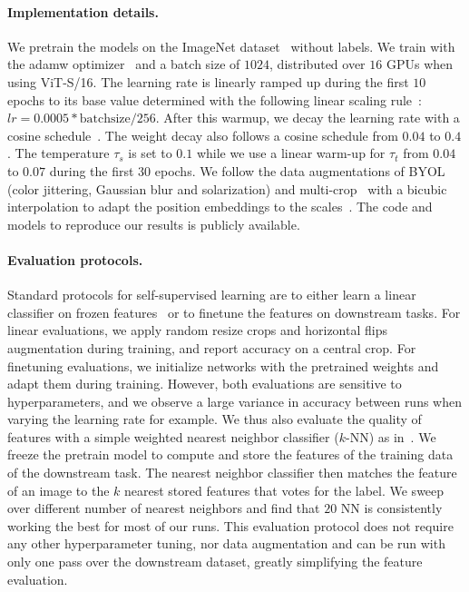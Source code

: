 \paragraph{Implementation details.}
We pretrain the models on the ImageNet dataset~\cite{russakovsky2015imagenet} without labels.
We train with the adamw optimizer~\cite{loshchilov2018fixing} and a batch size of $1024$, distributed over $16$ GPUs when using ViT-S/16.
The learning rate is linearly ramped up during the first $10$ epochs to its base value determined with the following linear scaling rule~\cite{goyal2017accurate}: $lr = 0.0005 * \text{batchsize} / 256$.
After this warmup, we decay the learning rate with a cosine schedule~\cite{loshchilov2016sgdr}.
The weight decay also follows a cosine schedule from $0.04$ to $0.4$.
The temperature $\tau_s$ is set to $0.1$ while we use a linear warm-up for $\tau_t$ from $0.04$ to $0.07$ during the first $30$ epochs.
We follow the data augmentations of BYOL~\cite{grill2020bootstrap} (color jittering, Gaussian blur and solarization) and multi-crop~\cite{caron2020unsupervised} with a bicubic interpolation to adapt the position embeddings to the scales~\cite{dosovitskiy2020image, touvron2020training}.
The code and models to reproduce our results is publicly available.

\paragraph{Evaluation protocols.}
Standard protocols for self-supervised learning are to either learn a linear classifier on frozen features~\cite{zhang2016colorful,he2020momentum} or to finetune the features on downstream tasks.
For linear evaluations, we apply random resize crops and horizontal flips augmentation during training, and report accuracy on a central crop.
For finetuning evaluations, we initialize networks with the pretrained weights and adapt them during training.
However, both evaluations are sensitive to hyperparameters, and we observe a large variance in accuracy between runs when varying the learning rate for example. 
We thus also evaluate the quality of features with a simple weighted nearest neighbor classifier ($k$-NN) as in~\cite{wu2018unsupervised}. 
We freeze the pretrain model to compute and store the features of the training data of the downstream task.
The nearest neighbor classifier then matches the feature of an image to the $k$ nearest stored features that votes for the label. 
We sweep over different number of nearest neighbors and find that $20$ NN is consistently working the best for most of our runs.
This evaluation protocol does not require any other hyperparameter tuning, nor data augmentation and can be run with only one pass over the downstream dataset, greatly simplifying the feature evaluation.
 
